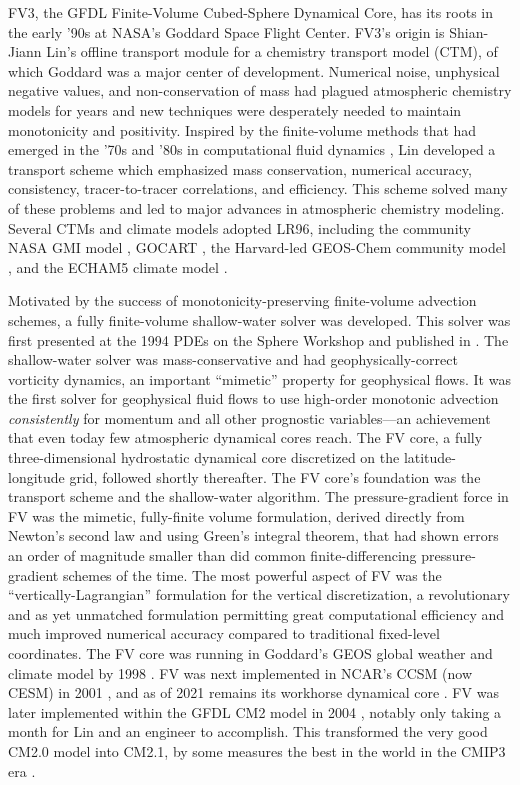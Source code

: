 \documentclass[10pt,letterpaper,margin=1in]{memoir}
\begin{document}
FV3, the GFDL Finite-Volume Cubed-Sphere Dynamical Core, has its roots in the early '90s at NASA's Goddard Space Flight Center. FV3's origin is Shian-Jiann Lin's offline transport module for a chemistry transport model (CTM), of which Goddard was a major center of development. Numerical noise, unphysical negative values, and non-conservation of mass had plagued atmospheric chemistry models for years \citep{Rood1987} and new techniques were desperately needed to maintain monotonicity and positivity. Inspired by the finite-volume methods that had emerged in the '70s and '80s in computational fluid dynamics \citep{VanLeer1977,CW84}, Lin developed a transport scheme which emphasized mass conservation, numerical accuracy, consistency, tracer-to-tracer correlations, and efficiency. This scheme \citep{LR96} solved many of these problems and led to major advances in atmospheric chemistry modeling. Several CTMs and climate models adopted LR96, including the community NASA GMI model \citep{Rotman2001}, GOCART \citep{Chin2000}, the Harvard-led GEOS-Chem community model \citep{Bey2001}, and the ECHAM5 climate model \citep{Roeckner2003}.

Motivated by the success of monotonicity-preserving finite-volume advection schemes, a fully finite-volume shallow-water solver was developed. This solver was first presented at the 1994 PDEs on the Sphere Workshop and published in \citet{LR97}. The shallow-water solver was mass-conservative and had geophysically-correct vorticity dynamics, an important ``mimetic'' property for geophysical flows. It was the first solver for geophysical fluid flows to use high-order monotonic advection \textit{consistently} for momentum and all other prognostic variables---an achievement that even today few atmospheric dynamical cores reach. The FV core, a fully three-dimensional hydrostatic dynamical core discretized on the latitude-longitude grid, followed shortly thereafter. The FV core's foundation was the \citet{LR96} transport scheme and the \citet{LR97} shallow-water algorithm. The pressure-gradient force in FV was the mimetic, fully-finite volume \citet{L97} formulation, derived directly from Newton's second law and using Green's integral theorem, that had shown errors an order of magnitude smaller than did common finite-differencing pressure-gradient schemes of the time. The most powerful aspect of FV was the ``vertically-Lagrangian'' formulation for the vertical discretization, a revolutionary and as yet unmatched formulation permitting great computational efficiency and much improved numerical accuracy compared to traditional fixed-level coordinates. The FV core was running in Goddard's GEOS global weather and climate model by 1998 \citep{lin1998flux,lin1999development}. FV was next implemented in NCAR's CCSM (now CESM) in 2001 \citep{Rasch2006}, and as of 2021 remains its workhorse dynamical core \citep{Danabasoglu2020}. FV was later implemented within the GFDL CM2 model in 2004 \citep{Delworth2006}, notably only taking a month for Lin and an engineer to accomplish. This transformed the very good CM2.0 model into CM2.1, by some measures the best in the world in the CMIP3 era \citep{Gleckler2008,Reichler2008}. 
\end{document}
